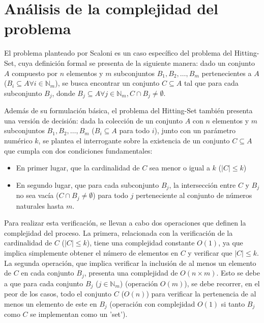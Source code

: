 \section{Análisis de la complejidad del problema}

El problema planteado por Scaloni es un caso específico del problema del 
Hitting-Set, cuya definición formal se presenta de la siguiente manera: dado un 
conjunto $A$ compuesto por $n$ elementos y $m$ subconjuntos $B_{1}, B_{2}, \dots, B_{m}$ 
pertenecientes a $A$ ($B_{i}\subseteq A \forall i \in \mathbb{N}_{m}$), se busca encontrar un conjunto $C \subseteq A$ tal que para cada 
subconjunto $B_{j}$, donde $B_{j} \subseteq A \forall j \in \mathbb{N}_{m},  C \cap B_{j}\neq \emptyset$. 

Además de su formulación básica, el problema del Hitting-Set también presenta una versión
de decisión: dada la colección de un conjunto $A$ con $n$ elementos y $m$ subconjuntos
$B_{1}, B_{2}, \dots, B_{m}$ ($B_{i}\subseteq A$ para todo $i$), junto con un 
parámetro numérico $k$, se plantea el interrogante sobre la existencia de un conjunto 
$C \subseteq A$ que cumpla con dos condiciones fundamentales:

\begin{itemize}
    \item En primer lugar, que la cardinalidad de $C$ sea menor o igual a $k$ ($\left| C \right|\leq k$) 
    \item En segundo lugar, que para cada subconjunto $B_{j}$, la intersección entre $C$ y $B_{j}$ no sea vacía ($C \cap B_{j} \neq \emptyset$) para todo $j$ perteneciente al conjunto de  números naturales hasta $m$.
\end{itemize}

Para realizar esta verificación, se llevan a cabo dos operaciones que definen la 
complejidad del proceso. La primera, relacionada con la verificación de la 
cardinalidad de $C$ ($\left| C \right|\leq k$), tiene una complejidad constante $O(1)$, 
ya que implica simplemente obtener el número de elementos en $C$ y verificar que $\left|C\right| \leq k$.
La segunda operación, que implica verificar la inclusión de al menos un elemento de $C$ 
en cada conjunto $B_{j}$, presenta una complejidad de $O(n \times m)$. Esto se debe a 
que para cada conjunto $B_{j}$ ($j \in \mathbb{N}_{m}$) (operación $O(m)$), se debe recorrer, en el peor de los casos, todo el conjunto $C$ 
($O(n)$) para verificar la pertenencia de al menos un elemento de este en $B_{j}$ 
(operación con complejidad $O(1)$ si tanto $B_{j}$ como $C$ se implementan como un 'set').

